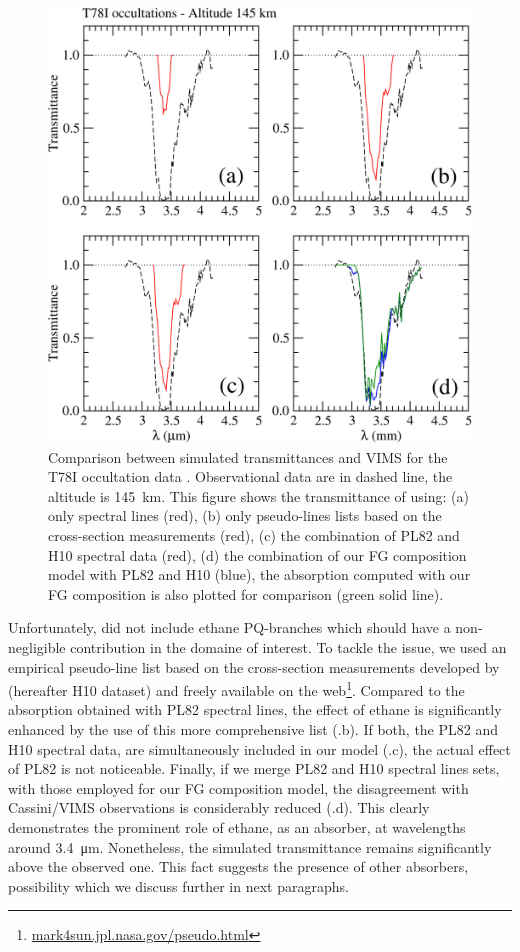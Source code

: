\documentclass{arxiv-icarus}
\begin{document}
\begin{figure}[!ht]
    \includegraphics[width=.95\linewidth]{Fig_5}
    \caption{Comparison between simulated transmittances and VIMS for the T78I occultation data \citep{Maltagliati2015}.
    Observational data are in dashed line, the altitude is \SI{145}{km}. This figure shows the transmittance of  using:
    (a) only \cite{Pine1982} spectral lines (red), (b) only pseudo-lines lists based on the cross-section measurements \citep{Harrison2010} (red), (c) the combination of PL82 and H10 spectral data (red), (d) the combination of our FG composition model with PL82 and H10 (blue), the absorption computed with our FG composition is also plotted for comparison (green solid line).}
    \label{fig:C2H6}
\end{figure}


Unfortunately, \cite{Pine1982} did not include ethane PQ-branches which should have a non-negligible contribution in the domaine
of interest. To tackle the issue, we used an empirical pseudo-line list based on the cross-section measurements developed by
\cite{Harrison2010} (hereafter H10 dataset) and freely available on the web\footnote{\href{http://mark4sun.jpl.nasa.gov/pseudo.html}{mark4sun.jpl.nasa.gov/pseudo.html}}.
Compared to the absorption obtained with PL82 spectral lines, the effect of ethane is significantly enhanced by the use of this more
comprehensive list (.b). If both, the PL82 and H10 spectral data, are simultaneously included in our model (.c),
the actual effect of PL82 is not noticeable. Finally, if we merge PL82 and H10 spectral lines sets, with those employed for our FG composition model, the disagreement with Cassini/VIMS observations is considerably reduced (.d).
This clearly demonstrates the prominent role of ethane, as an absorber, at wavelengths around \SI{3.4}{\um}. Nonetheless, the simulated transmittance remains significantly above the observed one. This fact suggests the presence of other absorbers, possibility which we discuss further in next paragraphs.
\end{document}
